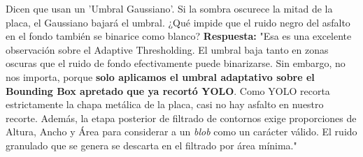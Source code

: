 \documentclass[11pt,a4paper]{article}
\begin{document}
\begin{trampa}{Dicen que usan un 'Umbral Gaussiano'. Si la sombra oscurece la mitad de la placa, el Gaussiano bajar\'a el umbral. ¿Qu\'e impide que el ruido negro del asfalto en el fondo tambi\'en se binarice como blanco?}
    \textbf{Respuesta:} "Esa es una excelente observaci\'on sobre el Adaptive Thresholding. El umbral baja tanto en zonas oscuras que el ruido de fondo efectivamente puede binarizarse. Sin embargo, no nos importa, porque \textbf{solo aplicamos el umbral adaptativo sobre el Bounding Box apretado que ya recort\'o YOLO}. Como YOLO recorta estrictamente la chapa met\'alica de la placa, casi no hay asfalto en nuestro recorte. Adem\'as, la etapa posterior de filtrado de contornos exige proporciones de Altura, Ancho y Área para considerar a un \emph{blob} como un car\'acter v\'alido. El ruido granulado que se genera se descarta en el filtrado por \'area m\'inima."
\end{trampa}
\end{document}
